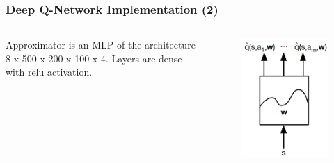 \documentclass{beamer}
\begin{document}
\begin{frame}
\frametitle{Deep Q-Network Implementation (2)}
\begin{columns}[c] %
	
	Approximator is an MLP of the 
	architecture
	8 x 500 x 200 x 100 x 4. Layers 
	are dense with relu activation. 
	
	\begin{figure}
		\includegraphics[scale=0.5]{nn}
	\end{figure}
	
\end{columns}
\end{frame}
\end{document}
